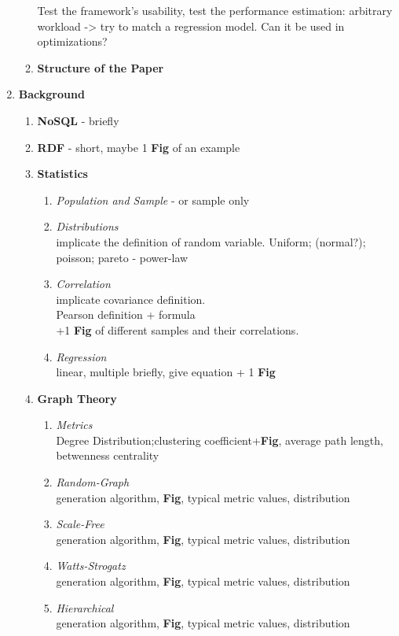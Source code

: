 \begin{enumerate}
\begin{enumerate}[label*=\arabic*.]
			Test the framework's usability, test the performance estimation: arbitrary workload -> try to match a regression model. Can it be used in optimizations?
			\item \textbf{Structure of the Paper}
		\end{enumerate}
	\item \textbf{Background}
		\begin{enumerate}[label*=\arabic*.]
			\item \textbf{NoSQL} - briefly
			\item \textbf{RDF} - short, maybe 1 \textbf{\textbf{Fig}} of an example
			\item \textbf{Statistics}
				\begin{enumerate}[label*=\arabic*.]
					\item \textit{Population and Sample} - or sample only
					\item \textit{Distributions}\\ implicate the definition of random variable.
							Uniform; (normal?); poisson; pareto - power-law
					\item \textit{Correlation}\\implicate covariance definition. \\
						Pearson definition + formula\\
						+1 \textbf{\textbf{Fig}} of different samples and their correlations.
					\item \textit{Regression}\\linear, multiple briefly, give equation
					+ 1 \textbf{\textbf{Fig}}
				\end{enumerate}
			\item \textbf{Graph Theory}
				\begin{enumerate}[label*=\arabic*.]
					\item \textit{Metrics}\\Degree Distribution;clustering coefficient+\textbf{Fig}, average path length, betwenness centrality
					\item \textit{Random-Graph}\\generation algorithm, \textbf{Fig}, typical metric values, distribution
					\item \textit{Scale-Free}\\generation algorithm, \textbf{Fig}, typical metric values, distribution
					\item \textit{Watts-Strogatz}\\generation algorithm, \textbf{Fig}, typical metric values, distribution
					\item \textit{Hierarchical}\\generation algorithm, \textbf{Fig}, typical metric values, distribution
				\end{enumerate}
		\end{enumerate}
		

\end{enumerate}
